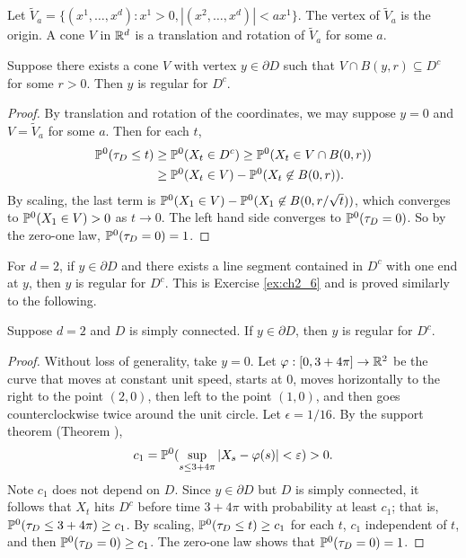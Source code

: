 Let $\widetilde{V}_a = \{(x^1,\ldots,x^d) : x^1 > 0, |(x^2,\ldots,x^d)| < ax^1\}$. The vertex of $\widetilde{V}_a$ is the origin. A cone $V$ in $\R^d$ is a translation and rotation of $\widetilde{V}_a$ for some $a$.

\begin{proposition}\label{prop:ch2_1.13}
Suppose there exists a cone $V$ with vertex $y \in \partial D$ such that $V \cap B(y,r) \subseteq D^c$ for some $r > 0$. Then $y$ is regular for $D^c$.
\end{proposition}

\begin{proof}
By translation and rotation of the coordinates, we may suppose $y = 0$ and $V = \widetilde{V}_a$ for some $a$. Then for each $t$,
\begin{align*}
    \P^0(\tau_D \leq t) &\geq \P^0(X_t \in D^c) \geq \P^0(X_t \in V \cap B(0,r)) \\
    &\geq \P^0(X_t \in V) - \P^0(X_t \not\in B(0,r)).
\end{align*}
By scaling, the last term is $\P^0(X_1 \in V) - \P^0(X_1 \not\in B(0,r/\sqrt{t}))$, which converges to $\P^0(X_1 \in V) > 0$ as $t \to 0$. The left hand side converges to $\P^0(\tau_D = 0)$. So by the zero-one law, $\P^0(\tau_D = 0) = 1$.
\end{proof}

For $d = 2$, if $y \in \partial D$ and there exists a line segment contained in $D^c$ with one end at $y$, then $y$ is regular for $D^c$. This is Exercise \ref{ex:ch2_6} and is proved similarly to the following.

\begin{proposition}\label{prop:ch2_1.14}
Suppose $d = 2$ and $D$ is simply connected. If $y \in \partial D$, then $y$ is regular for $D^c$.
\end{proposition}

\begin{proof}
Without loss of generality, take $y = 0$. Let $\varphi: [0,3+4\pi] \to \R^2$ be the curve that moves at constant unit speed, starts at $0$, moves horizontally to the right to the point $(2,0)$, then left to the point $(1,0)$, and then goes counterclockwise twice around the unit circle. Let $\epsilon = 1/16$. By the support theorem (Theorem ),
\[
    c_1 = \P^0(\sup_{s\leq 3+4\pi} |X_s - \varphi(s)| < \epsilon) > 0.
\]
Note $c_1$ does not depend on $D$. Since $y \in \partial D$ but $D$ is simply connected, it follows that $X_t$ hits $D^c$ before time $3+4\pi$ with probability at least $c_1$; that is, $\P^0(\tau_D \leq 3+4\pi) \geq c_1$. By scaling, $\P^0(\tau_D \leq t) \geq c_1$ for each $t$, $c_1$ independent of $t$, and then $\P^0(\tau_D = 0) \geq c_1$. The zero-one law shows that $\P^0(\tau_D = 0) = 1$.
\end{proof}

